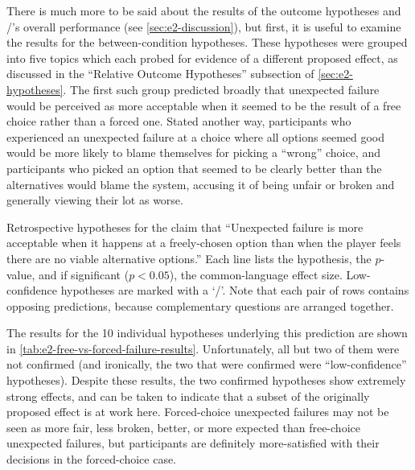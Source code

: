 There is much more to be said about the results of the outcome hypotheses and \dunyazad/'s overall performance (see \cref{sec:e2-discussion}), but first, it is useful to examine the results for the between-condition hypotheses.
%
These hypotheses were grouped into five topics which each probed for evidence of a different proposed effect, as discussed in the ``Relative Outcome Hypotheses'' subsection of \cref{sec:e2-hypotheses}.
%
The first such group predicted broadly that unexpected failure would be perceived as more acceptable when it seemed to be the result of a free choice rather than a forced one.
%
Stated another way, participants who experienced an unexpected failure at a choice where all options seemed good would be more likely to blame themselves for picking a ``wrong'' choice, and participants who picked an option that seemed to be clearly better than the alternatives would blame the system, accusing it of being unfair or broken and generally viewing their lot as worse.

\begin{table}[!b]
\centering
\bgroup
\def\arraystretch{1.3}
\setlength{\tabcolsep}{0.6em}

\egroup
\caption[Retrospective free vs. forced failure results]{Retrospective hypotheses for the claim that ``Unexpected failure is more acceptable when it happens at a freely-chosen option than when the player feels there are no viable alternative options.'' Each line lists the hypothesis, the $p$-value, and if significant ($p < 0.05$), the common-language effect size. Low-confidence hypotheses are marked with a `\lc/'. Note that each pair of rows contains opposing predictions, because complementary questions are arranged together.}
  \label{tab:e2-free-vs-forced-failure-results}
\end{table}


The results for the 10 individual hypotheses underlying this prediction are shown in \cref{tab:e2-free-vs-forced-failure-results}.
%
Unfortunately, all but two of them were not confirmed (and ironically, the two that were confirmed were ``low-confidence'' hypotheses).
%
Despite these results, the two confirmed hypotheses show extremely strong effects, and can be taken to indicate that a subset of the originally proposed effect is at work here.
%
Forced-choice unexpected failures may not be seen as more fair, less broken, better, or more expected than free-choice unexpected failures, but participants are definitely more-satisfied with their decisions in the forced-choice case.


